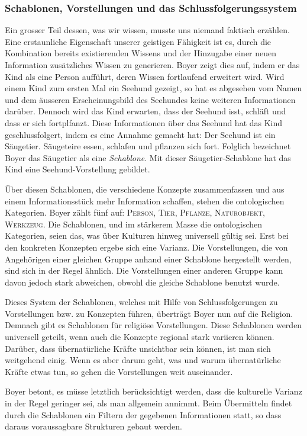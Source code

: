 \subsubsection{Schablonen, Vorstellungen und das Schlussfolgerungssystem}
Ein grosser Teil dessen, was wir wissen, musste uns niemand faktisch erzählen. Eine erstaunliche Eigenschaft unserer geistigen Fähigkeit ist es, durch die Kombination bereits existierenden Wissens und der Hinzugabe einer neuen Information zusätzliches Wissen zu generieren. Boyer zeigt dies auf, indem er das Kind als eine Person aufführt, deren Wissen fortlaufend erweitert wird. Wird einem Kind zum ersten Mal ein Seehund gezeigt, so hat es abgesehen vom Namen und dem äusseren Erscheinungsbild des Seehundes keine weiteren Informationen darüber. Dennoch wird das Kind erwarten, dass der Seehund isst, schläft und dass er sich fortplfanzt. Diese Informationen über das Seehund hat das Kind geschlussfolgert, indem es eine Annahme gemacht hat: Der Seehund ist ein Säugetier. Säugeteire essen, schlafen und pflanzen sich fort. Folglich bezeichnet Boyer das Säugetier als eine \emph{Schablone}. Mit dieser Säugetier-Schablone hat das Kind eine Seehund-Vorstellung gebildet. 

Über diesen Schablonen, die verschiedene Konzepte zusammenfassen und aus einem Informationsstück mehr Information schaffen, stehen die ontologischen Kategorien. Boyer zählt fünf auf: \textsc{Person, Tier, Pflanze, Naturobjekt, Werkzeug}. Die Schablonen, und im stärkerem Masse die ontologischen Kategorien, seien das, was über Kulturen hinweg universell gültig sei. Erst bei den konkreten Konzepten ergebe sich eine Varianz. Die Vorstellungen, die von Angehörigen einer gleichen Gruppe anhand einer Schablone hergestellt werden, sind sich in der Regel ähnlich. Die Vorstellungen einer anderen Gruppe kann davon jedoch stark abweichen, obwohl die gleiche Schablone benutzt wurde. 

Dieses System der Schablonen, welches mit Hilfe von Schlussfolgerungen zu Vorstellungen bzw. zu Konzepten führen, überträgt Boyer nun auf die Religion. Demnach gibt es Schablonen für religiöse Vorstellungen. Diese Schablonen werden universell geteilt, wenn auch die Konzepte regional stark variieren können. Darüber, dass übernatürliche Kräfte unsichtbar sein können, ist man sich weitgehend einig. Wenn es aber darum geht, was und warum übernatürliche Kräfte etwas tun, so gehen die Vorstellungen weit auseinander. 

Boyer betont, es müsse letztlich berücksichtigt werden, dass die kulturelle Varianz in der Regel geringer sei, als man allgemein annimmt. Beim Übermitteln findet durch die Schablonen ein Filtern der gegebenen Informationen statt, so dass daraus voraussagbare Strukturen gebaut werden.\todo{[65]}

